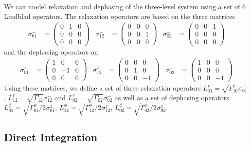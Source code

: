 We can model relaxation and dephasing of the three-level system using a set of 6 Lindblad operators. The relaxation operators are based on the three matrices
%
\begin{align}
\sigma^-_{01} & =  \left( \begin{array}{ccc} 0 & 1 & 0 \\ 0 & 0 & 0 \\ 0 & 0 & 0 \end{array} \right) & \sigma^-_{12} & =  \left( \begin{array}{ccc} 0 & 0 & 0 \\ 0 & 0 & 1 \\ 0 & 0 & 0 \end{array} \right) &
\sigma^-_{02} & =  \left( \begin{array}{ccc} 0 & 0 & 1 \\ 0 & 0 & 0 \\ 0 & 0 & 0 \end{array} \right)
\end{align}
%
and the dephasing operators on
%
\begin{align}
\sigma^z_{01} & =  \left( \begin{array}{ccc} 1 & 0 & 0 \\ 0 &-1 & 0 \\ 0 & 0 & 0 \end{array} \right) &
\sigma^z_{12} & =  \left( \begin{array}{ccc} 0 & 0 & 0 \\ 0 & 1 & 0 \\ 0 & 0 &-1 \end{array} \right) &
\sigma^z_{02} & =  \left( \begin{array}{ccc} 1 & 0 & 0 \\ 0 & 0 & 0 \\ 0 & 0 &-1 \end{array} \right)  
\end{align}
%
Using these matrices, we define a set of three relaxation operators $L^r_{01} = \sqrt{\Gamma^r_{10}}\sigma^-_{01}$, $L^r_{12} = \sqrt{\Gamma^r_{12}}\sigma^-_{12}$ and $L^r_{02}=\sqrt{\Gamma^r_{02}}\sigma^-_{02}$ as well as a set of dephasing operators $L^\phi_{01} = \sqrt{\Gamma^\phi_{01}/2}\sigma^z_{01}$, $L^\phi_{12} = \sqrt{\Gamma^\phi_{12}/2}\sigma^z_{12}$, $L^\phi_{02}=\sqrt{\Gamma^\phi_{02}/2}\sigma^z_{02}$.

\subsection{Direct Integration}

